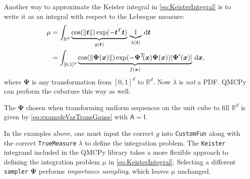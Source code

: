 \documentclass[graybox]{svmult}
\begin{document}
Another way to approximate the Keister integral in \eqref{eq:KeisterIntegral} is to write it as an integral with respect to the Lebesgue measure:
\begin{align*} 
	\mu 
	& = \int_{\mathbb{R}^d} \underbrace{\cos(\lVert \boldsymbol{t} \rVert) \exp(-\boldsymbol{t}^T \boldsymbol{t}) }_{g(\boldsymbol{t})} \, \underbrace{1}_{\lambda(\boldsymbol{t})} \,\mathrm{d} \boldsymbol{t} \\
	& = \int_{[0,1]^d} \underbrace{\cos(\lVert \boldsymbol{\Psi}(\boldsymbol{x}) \rVert) \exp(-\boldsymbol{\Psi}^T\!\!(\boldsymbol{x}) \boldsymbol{\Psi}(\boldsymbol{x})) \lvert \boldsymbol{\Psi}'(\boldsymbol{x})\rvert  }_{f(\boldsymbol{x})} \, \mathrm{d} \boldsymbol{x},
\end{align*}
where $\boldsymbol{\Psi}$ is any transformation from $[0,1]^d$ to $\mathbb{R}^d$. Now $\lambda$ is \emph{not} a PDF.  QMCPy can perform the cubature this way as well.

The $\boldsymbol{\Psi}$ chosen when transforming uniform sequences on the unit cube to fill $\mathbb{R}^d$ is  given by \eqref{eq:exampleVarTransGauss} with $\mathsf{A} = \mathsf{I}$.

In the examples above, one must input the correct $g$ into \texttt{CustomFun} along with the correct \texttt{TrueMeasure} $\lambda$ to define the integration problem. The \texttt{Keister} integrand included in the QMCPy library takes a more flexible approach to defining the integration problem $\mu$ in \eqref{eq:KeisterIntegral}. Selecting a different \texttt{sampler} $\boldsymbol{\Psi}$ performs  \emph{importance sampling}, which leaves $\mu$ unchanged.  

\end{document}
